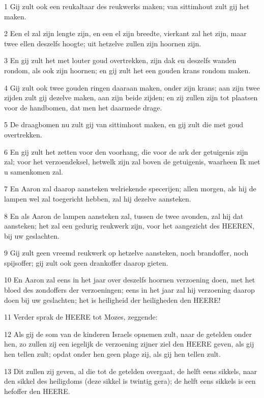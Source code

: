 \par 1 Gij zult ook een reukaltaar des reukwerks maken; van sittimhout zult gij het maken.
\par 2 Een el zal zijn lengte zijn, en een el zijn breedte, vierkant zal het zijn, maar twee ellen deszelfs hoogte; uit hetzelve zullen zijn hoornen zijn.
\par 3 En gij zult het met louter goud overtrekken, zijn dak en deszelfs wanden rondom, als ook zijn hoornen; en gij zult het een gouden krans rondom maken.
\par 4 Gij zult ook twee gouden ringen daaraan maken, onder zijn krans; aan zijn twee zijden zult gij dezelve maken, aan zijn beide zijden; en zij zullen zijn tot plaatsen voor de handbomen, dat men het daarmede drage.
\par 5 De draagbomen nu zult gij van sittimhout maken, en gij zult die met goud overtrekken.
\par 6 En gij zult het zetten voor den voorhang, die voor de ark der getuigenis zijn zal; voor het verzoendeksel, hetwelk zijn zal boven de getuigenis, waarheen Ik met u samenkomen zal.
\par 7 En Aaron zal daarop aansteken welriekende specerijen; allen morgen, als hij de lampen wel zal toegericht hebben, zal hij dezelve aansteken.
\par 8 En als Aaron de lampen aansteken zal, tussen de twee avonden, zal hij dat aansteken; het zal een gedurig reukwerk zijn, voor het aangezicht des HEEREN, bij uw geslachten.
\par 9 Gij zult geen vreemd reukwerk op hetzelve aansteken, noch brandoffer, noch spijsoffer; gij zult ook geen drankoffer daarop gieten.
\par 10 En Aaron zal eens in het jaar over deszelfs hoornen verzoening doen, met het bloed des zondoffers der verzoeningen; eens in het jaar zal hij verzoening daarop doen bij uw geslachten; het is heiligheid der heiligheden den HEERE!
\par 11 Verder sprak de HEERE tot Mozes, zeggende:
\par 12 Als gij de som van de kinderen Israels opnemen zult, naar de getelden onder hen, zo zullen zij een iegelijk de verzoening zijner ziel den HEERE geven, als gij hen tellen zult; opdat onder hen geen plage zij, als gij hen tellen zult.
\par 13 Dit zullen zij geven, al die tot de getelden overgaat, de helft eens sikkels, naar den sikkel des heiligdoms (deze sikkel is twintig gera); de helft eens sikkels is een hefoffer den HEERE.
